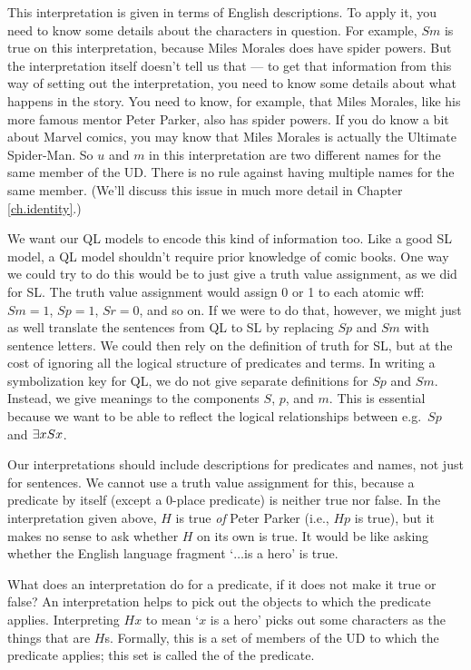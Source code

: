 This interpretation is given in terms of English descriptions. To apply it, you need to know some details about the characters in question. For example, $Sm$ is true on this interpretation, because Miles Morales does have spider powers. But the interpretation itself doesn't tell us that --- to get that information from this way of setting out the interpretation, you need to know some details about what happens in the story. You need to know, for example, that Miles Morales, like his more famous mentor Peter Parker, also has spider powers. If you do know a bit about Marvel comics, you may know that Miles Morales is actually the Ultimate Spider-Man. So $u$ and $m$ in this interpretation are two different names for the same member of the UD. There is no rule against having multiple names for the same member. (We'll discuss this issue in much more detail in Chapter \ref{ch.identity}.)

We want our QL models to encode this kind of information too. Like a good SL model, a QL model shouldn't require prior knowledge of comic books. One way we could try to do this would be to just give a truth value assignment, as we did for SL. The truth value assignment would assign 0 or 1 to each atomic wff: $Sm=1$, $Sp=1$, $Sr=0$, and so on. If we were to do that, however, we might just as well translate the sentences from QL to SL by replacing $Sp$ and $Sm$ with sentence letters. We could then rely on the definition of truth for SL, but at the cost of ignoring all the logical structure of predicates and terms. In writing a symbolization key for QL, we do not give separate definitions for $Sp$ and $Sm$. Instead, we give meanings to the components $S$, $p$, and $m$. This is essential because we want to be able to reflect the logical relationships between e.g.\ $Sp$ and $\exists x Sx$.

Our interpretations should include descriptions for predicates and names, not just for sentences. We cannot use a truth value assignment for this, because a predicate by itself (except a 0-place predicate) is neither true nor false. In the interpretation given above, $H$ is true \emph{of} Peter Parker (i.e., $Hp$ is true), but it makes no sense to ask whether $H$ on its own is true. It would be like asking whether the English language fragment `$\ldots$is a hero' is true.

What does an interpretation do for a predicate, if it does not make it true or false? An interpretation helps to pick out the objects to which the predicate applies. Interpreting $Hx$ to mean `$x$ is a hero' picks out some characters as the things that are $H$s. Formally, this is a set of members of the UD to which the predicate applies; this set is called the  of the predicate. 

